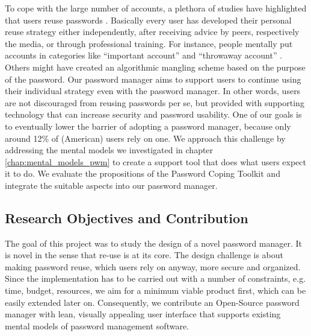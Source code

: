 To cope with the large number of accounts, a plethora of studies have highlighted that users reuse passwords \cite{Das2014TangledWeb, Florencio2007LargeScaleStudyPasswordHabits,Haque2014Hierarchy,Stobert2014PasswordLifeCycle}. Basically every user has developed their personal reuse strategy either independently, after receiving advice by peers, respectively the media, or through professional training. For instance, people mentally put accounts in categories like ``important account'' and ``throwaway account'' \cite{Egelman2013DoesMyPasswordGoUpToEleven}. Others might have created an algorithmic mangling scheme based on the purpose of the password. Our password manager aims to support users to continue using their individual strategy even with the password manager. In other words, users are not discouraged from reusing passwords per se, but provided with supporting technology that can increase security and password usability. One of our goals is to eventually lower the barrier of adopting a password manager, because only around 12\% of (American) users rely on one. We approach this challenge by addressing the mental models we investigated in chapter \ref{chap:mental_models_pwm} to create a support tool that does what users expect it to do. We evaluate the propositions of the Password Coping Toolkit and integrate the suitable aspects into our password manager.

\subsection{Research Objectives and Contribution}
The goal of this project was to study the design of a novel password manager. It is novel in the sense that re-use is at its core. The design challenge is about making password reuse, which users rely on anyway, more secure and organized. Since the implementation has to be carried out with a number of constraints, e.g. time, budget, resources, we aim for a minimum viable product first, which can be easily extended later on. Consequently, we contribute an Open-Source password manager with lean, visually appealing user interface that supports existing mental models of password management software. 

